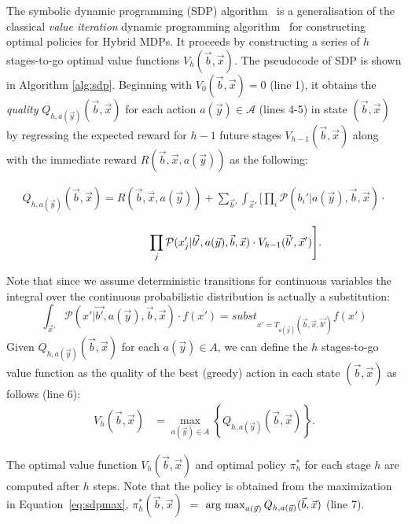 \documentclass[letterpaper]{article}
\def\argmax{\operatornamewithlimits{arg~max}}
\begin{document}
The symbolic dynamic programming (SDP) algorithm~\cite{sanner11,zamani12} is a generalisation of the classical {\it value iteration} dynamic programming algorithm~\cite{bellman57} for constructing optimal policies for Hybrid MDPs.
It proceeds by constructing a series of $h$ stages-to-go optimal value functions $V_h(\vec{b},\vec{x})$.
The pseudocode of SDP is shown in Algorithm \ref{alg:sdp}.
Beginning with $V_0(\vec{b},\vec{x}) = 0$ (line 1), it obtains the \emph{quality} $Q_{h,a(\vec{y})}(\vec{b},\vec{x})$ for each action $a(\vec{y}) \in \mathcal{A}$ (lines 4-5) in state $(\vec{b},\vec{x})$ by regressing the expected reward for $h-1$ future stages $V_{h-1}(\vec{b},\vec{x})$ along with the immediate reward $R(\vec{b},\vec{x},a(\vec{y}))$ as the following:
{\small
\begin{align}
Q_{h,a(\vec{y})}(\vec{b},\vec{x}) =  R(\vec{b},\vec{x},a(\vec{y})) + \sum_{\vec{b}'} \int_{\vec{x}'} \Bigg[ 
\prod_i \mathcal{P}(b_i' | a(\vec{y}),\vec{b},\vec{x}) \cdot \nonumber 
\end{align}

\begin{align}
\hspace{20mm} \prod_j \mathcal{P}(x_j' | \vec{b'}, a(\vec{y}),\vec{b},\vec{x})\cdot V_{h-1}(\vec{b}',\vec{x}') \Bigg]. \label{eq:sdpregr} 
\end{align}
}
Note that since we assume deterministic transitions for continuous variables the integral over the continuous probabilistic distribution is actually a substitution:
$$
 \int_{\vec{x}'} \mathcal{P}(x' | \vec{b'}, a(\vec{y}),\vec{b},\vec{x}) \cdot f(x') =
subst_{x' = T_{a(\vec{y})}(\vec{b},\vec{x},\vec{b'})} f(x') 
$$
Given $Q_{h,a(\vec{y})}(\vec{b},\vec{x})$ for each $a(\vec{y}) \in A$, we can define the $h$ stages-to-go value function as the quality of the best (greedy) action in each state $(\vec{b},\vec{x})$ as follows (line 6):
\begin{align}
V_{h}(\vec{b},\vec{x}) & = \max_{a(\vec{y}) \in A} \left\{ Q_{h,a(\vec{y})}(\vec{b},\vec{x}) \right\}. \label{eq:sdpmax}
\end{align}

The optimal value function $V_h(\vec{b},\vec{x})$ and optimal policy $\pi^*_h$ for each stage $h$ are computed after $h$ steps. Note that the policy is obtained from the maximization in Equation~\ref{eq:sdpmax}, $\pi^*_h(\vec{b},\vec{x})$ $=$ $\argmax_{a(\vec{y})} Q_{h,a(\vec{y})}(\vec{b},\vec{x})$ (line 7). 
\end{document}
